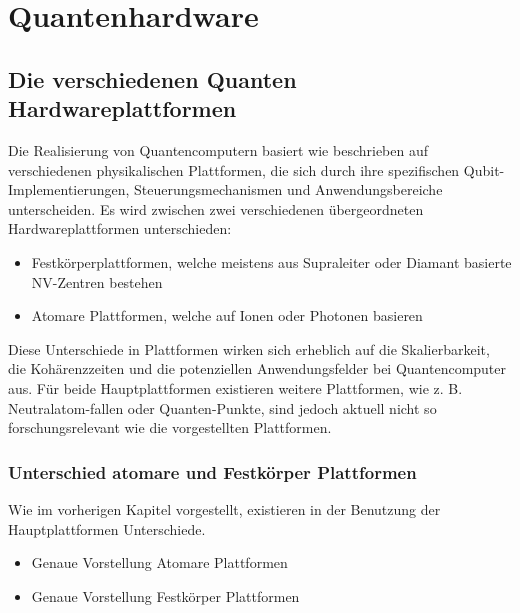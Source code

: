 \chapter{Quantenhardware}
\label{hardware} %



\section{Die verschiedenen Quanten Hardwareplattformen}
Die Realisierung von Quantencomputern basiert wie beschrieben auf verschiedenen physikalischen Plattformen, die sich durch ihre spezifischen Qubit-Implementierungen, Steuerungsmechanismen und Anwendungsbereiche unterscheiden. Es wird zwischen zwei verschiedenen übergeordneten Hardwareplattformen unterschieden:
\begin{itemize}
    \item Festkörperplattformen, welche meistens aus Supraleiter oder Diamant basierte NV-Zentren bestehen
    \item Atomare Plattformen, welche auf Ionen oder Photonen basieren
\end{itemize}
Diese Unterschiede in Plattformen wirken sich erheblich auf die Skalierbarkeit, die Kohärenzzeiten und die potenziellen Anwendungsfelder bei Quantencomputer aus. Für beide Hauptplattformen existieren weitere Plattformen, wie z. B. Neutralatom-fallen oder Quanten-Punkte, sind jedoch aktuell nicht so forschungsrelevant wie die vorgestellten Plattformen.

\subsection{Unterschied atomare und Festkörper Plattformen}

Wie im vorherigen Kapitel vorgestellt, existieren in der Benutzung der Hauptplattformen Unterschiede.
\begin{itemize}
    \item Genaue Vorstellung Atomare Plattformen
    \item Genaue Vorstellung Festkörper Plattformen
\end{itemize}

